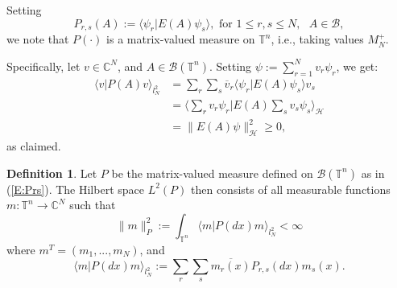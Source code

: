 \documentclass{birkmult}
\theoremstyle{definition}
\newtheorem{defn}[thm]{Definition}
\theoremstyle{remark}
\numberwithin{equation}{section}
\begin{document}
Setting
\begin{equation}
\label{E:Prs}
  P_{r,s}(A):= \langle \psi_{r}|E(A)\psi_{s} \rangle, \text{ for }
  1 \leq r, s \leq N, \text{  } A \in \mathcal{B}, 
\end{equation}
we note that $P(\cdot)$ is a matrix-valued measure on $\mathbb{T}^{n}$,
i.e., taking values $M_{N}^{+}$.

Specifically, let $v \in \mathbb{C}^{N}$, and 
$A \in \mathcal{B}(\mathbb{T}^{n})$.  Setting 
$\psi := \sum_{r=1}^{N}v_{r}\psi_{r}$, we get: 
\begin{align*}
  \langle v|P(A)v \rangle_{l_{N}^{2}} 
  &= \sum_{r}\sum_{s}\overline{v}_{r}\langle \psi_{r}|E(A)\psi_{s} \rangle 
  v_{s} \\
  &= \langle \sum_{r}v_{r}\psi_{r}|E(A)\sum_{s}v_{s}\psi_{s}
  \rangle_{\mathcal{H}} \\
  &= \|E(A)\psi\|_{\mathcal{H}}^{2} \geq 0,
\end{align*}
as claimed. 

\begin{defn}
\label{D:3.2}
Let $P$ be the matrix-valued measure defined on $\mathcal{B}(\mathbb{T}^{n})$
as in (\ref{E:Prs}).  The Hilbert space $L^{2}(P)$ then consists of all
measurable functions $m:\mathbb{T}^{n} \to \mathbb{C}^{N}$ such that
\begin{equation}
\label{E:mnormp}
  \|m\|_{P}^{2}:= \int_{\mathbb{T}^{n}}\langle m| P(dx)m \rangle_{l_{N}^{2}}
  < \infty
\end{equation}
where $m^{T} = (m_{1}, ..., m_{N})$, and 
\begin{equation}
\label{E:mPm}
  \langle m| P(dx)m \rangle_{l_{N}^{2}} := 
  \sum_{r}\sum_{s} \overline{m_{r}(x)}P_{r,s}(dx)m_{s}(x).
\end{equation}
\end{defn}
\end{document}
